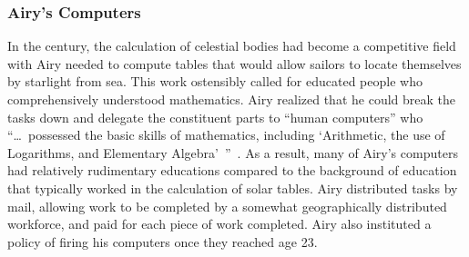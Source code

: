 \documentclass[trackingWork]{subfiles}
\begin{document}
\onlyinsubfile{\clearpage}
\subsubsection{Airy's Computers}
In the  century, the calculation of celestial bodies had become
a competitive field with 
Airy needed to compute tables that would
allow sailors to locate themselves by starlight from sea.
This work ostensibly called for educated people who comprehensively understood mathematics.
Airy realized that he could break the tasks down and delegate the constituent parts
to ``human computers'' who
``\dots~possessed the basic skills of mathematics,
including `Arithmetic, the use of Logarithms, and Elementary Algebra'~''~\cite{grier2013computers}.
As a result, many of Airy's computers had relatively rudimentary educations
compared to the background of education that typically worked in the calculation of solar tables.
Airy distributed tasks by mail,
allowing work to be completed by a somewhat geographically distributed workforce,
and paid for each piece of work completed.
Airy also instituted a policy of firing his computers once they reached age 23.










\onlyinsubfile{
  }
\end{document}

